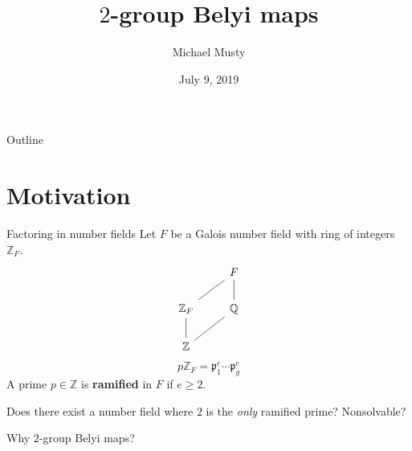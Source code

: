 \documentclass[xcolor=dvipsnames]{beamer}
\title{$2$-group Belyi maps}
\author{Michael Musty}
\date{July 9, 2019}
\institute{Dartmouth College}
\theoremstyle{plain}
\newcommand{\QQ}{\mathbb Q}
\newcommand{\ZZ}{\mathbb Z}
\begin{document}
  \maketitle
  \begin{frame}{Outline}
    \tableofcontents
  \end{frame}
  \section{Motivation}{
    \begin{frame}[fragile]{Factoring in number fields}
      Let $F$ be a Galois number field with ring
      of integers $\ZZ_F$.
      \begin{align*}
        \begin{tikzcd}[ampersand replacement=\&]
          \&F\arrow[dash]{dl}\\
          \ZZ_F\arrow[dash]{d}\&\QQ\arrow[dash]{u}\\
          \ZZ\arrow[dash]{ur}
        \end{tikzcd}
      \end{align*}
      \pause
      \[
        p\ZZ_F = \mathfrak{p}_1^{e}\cdots\mathfrak{p}_g^{e}
      \]
      \pause
      A prime $p\in\ZZ$ is \textbf{ramified} in $F$ if
      $e\geq 2$.
      \pause\par
      Does there exist a number field
      where $2$ is the \emph{only} ramified prime?
      \pause
      Nonsolvable?
    \end{frame}
    \begin{frame}[fragile]{Why $2$-group Belyi maps?}
      \begin{center}
\end{center}
\end{frame}}
\end{document}
